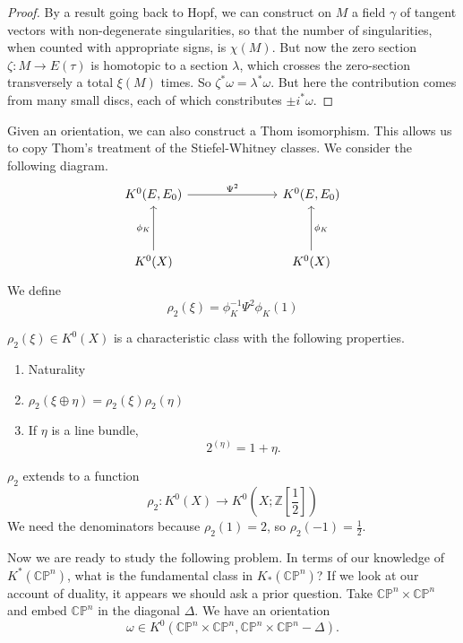 \documentclass[../main]{subfiles}
\begin{document}
\begin{proof}
By a result going back to Hopf, we can construct on $M$ a field $\gamma$ of tangent vectors with non-degenerate singularities, so that the number of singularities, when counted with appropriate signs, is $\chi(M)$. But now the zero section $\zeta:M\longrightarrow E(\tau)$ is homotopic to a section $\lambda$, which crosses the zero-section transversely a total $\xi(M)$ times. So $\zeta^\ast \omega=\lambda^\ast \omega$. But here the contribution comes from many small discs, each of which constributes $\pm i^\ast \omega$.
\end{proof}
\par Given an orientation, we can also construct a Thom isomorphism. This allows us to copy Thom's treatment of the Stiefel-Whitney classes. We consider the following diagram.
\[\begin{tikzcd}
	K^0(E,E_0) &&& K^0(E,E_0) \\
	\\
	K^0(X) &&& K^0(X)
	\arrow["\phi_K", from=3-1, to=1-1]
	\arrow["\phi_K"', from=3-4, to=1-4]
	\arrow["\Psi^2", from=1-1, to=1-4]
\end{tikzcd}\]
We define 
\[\rho_2(\xi)=\phi_K^{-1}\Psi^2\phi_K(1)\]
\begin{proposition}\label{prop:p3ch11.5}
$\rho_2(\xi)\in K^0(X)$ is a characteristic class with the following properties.
\begin{enumerate}
    \item Naturality
    \item $\rho_2(\xi\oplus\eta)=\rho_2(\xi)\rho_2(\eta)$
    \item If $\eta$ is a line bundle,
    \[2^{(\eta)}=1+\eta.\]
\end{enumerate}
\end{proposition}
\begin{proposition}\label{prop:p3ch11.6}
$\rho_2$ extends to a function
\[\rho_2:K^0(X)\longrightarrow K^0\left(X;\mathbb{Z}\left[\frac{1}{2}\right]\right)\]
We need the denominators because $\rho_2(1)=2$, so $\rho_2(-1)=\frac{1}{2}$.
\end{proposition}
\par Now we are ready to study the following problem. In terms of our knowledge of $K^\ast (\mathbb{CP}^n)$, what is the fundamental class in $K_\ast (\mathbb{CP}^n)$? If we look at our account of duality, it appears we should ask a prior question. Take $\mathbb{CP}^n\times\mathbb{CP}^n$ and embed $\mathbb{CP}^n$ in the diagonal $\Delta$. We have an orientation 
\[\omega \in K^0(\mathbb{CP}^n\times\mathbb{CP}^n, \mathbb{CP}^n\times\mathbb{CP}^n -\Delta).\]
\end{document}
